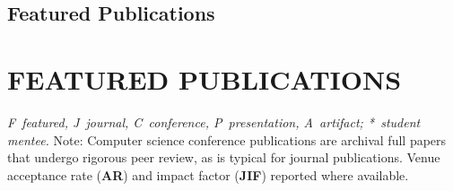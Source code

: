 \ifx\cvfocus\cvteachingfocus
\subsection*{Featured Publications}\label{sec:featured}
\else
\section{FEATURED PUBLICATIONS}\label{sec:featured}
\noindent
\textit{F~featured, J~journal, C~conference, P~presentation, A~artifact; *~student mentee.}
Note: Computer science conference publications are archival full papers that undergo rigorous peer review, as is typical
for journal publications. Venue acceptance rate (\textbf{AR}) and impact factor (\textbf{JIF}) reported where available.
\vspace{1pt}
\fi

